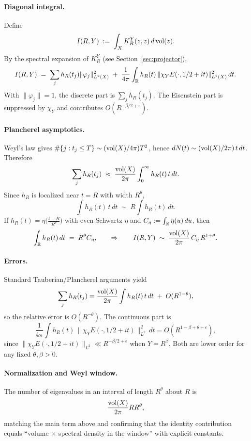 \paragraph{Diagonal integral.}
Define
\[
I(R,Y) \;:=\; \int_X K_R^Y(z,z)\,d\operatorname{vol}(z).
\]
By the spectral expansion of $K_R^Y$ (see Section~\ref{sec:projector}),
\[
I(R,Y) \;=\; \sum_j h_R(t_j)\|\varphi_j\|^2_{L^2(X)} \;+\;
\frac{1}{4\pi}\int_{\mathbb{R}} h_R(t)\,\|\chi_Y E(\cdot,1/2+it)\|^2_{L^2(X)}\,dt.
\]
With $\|\varphi_j\|=1$, the discrete part is $\sum_j h_R(t_j)$. The Eisenstein part
is suppressed by $\chi_Y$ and contributes $O(R^{-\beta/2+\epsilon})$.

\paragraph{Plancherel asymptotics.}
Weyl’s law gives $\#\{j:t_j\le T\}\sim (\operatorname{vol}(X)/4\pi)T^2$, hence
$dN(t)\sim (\operatorname{vol}(X)/2\pi)\,t\,dt$. Therefore
\[
\sum_j h_R(t_j) \;\approx\; \frac{\operatorname{vol}(X)}{2\pi}\int_0^\infty h_R(t)\,t\,dt.
\]
Since $h_R$ is localized near $t=R$ with width $R^\theta$,
\[
\int h_R(t)\,t\,dt \;\sim\; R\int h_R(t)\,dt.
\]
If $h_R(t)=\eta\!\big(\frac{t-R}{R^\theta}\big)$ with even Schwartz $\eta$ and
$C_\eta:=\int_{\mathbb{R}}\eta(u)\,du$, then
\[
\int_{\mathbb{R}} h_R(t)\,dt \;=\; R^\theta C_\eta,
\qquad\Rightarrow\qquad
I(R,Y) \;\sim\; \frac{\operatorname{vol}(X)}{2\pi}\,C_\eta\,R^{1+\theta}.
\]

\paragraph{Errors.}
Standard Tauberian/Plancherel arguments yield
\[
\sum_j h_R(t_j)
= \frac{\operatorname{vol}(X)}{2\pi}\int h_R(t)\,t\,dt \;+\; O(R^{1-\theta}),
\]
so the relative error is $O(R^{-\theta})$. The continuous part is
\[
\frac{1}{4\pi}\!\int h_R(t)\,\|\chi_Y E(\cdot,1/2+it)\|^2_{L^2}\,dt
= O(R^{1-\beta+\theta+\epsilon}),
\]
since $\|\chi_Y E(\cdot,1/2+it)\|_{L^2}\ll R^{-\beta/2+\epsilon}$ when $Y=R^\beta$.
Both are lower order for any fixed $\theta,\beta>0$.

\paragraph{Normalization and Weyl window.}
The number of eigenvalues in an interval of length $R^\theta$ about $R$ is
\[
\frac{\operatorname{vol}(X)}{2\pi} R R^\theta,
\]
matching the main term above and confirming that the identity contribution equals
“volume $\times$ spectral density in the window” with explicit constants.

